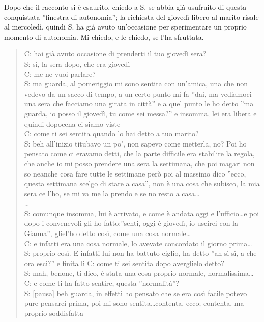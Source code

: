 Dopo che il racconto si è esaurito, chiedo a S. se abbia già usufruito di questa conquistata ''finestra di autonomia''; la richiesta del giovedì libero al marito risale al mercoledì, quindi S. ha già avuto un'occasione per sperimentare un proprio momento di autonomia. Mi chiedo, e le chiedo, se l'ha sfruttata.

\begin{verse}
C: hai già avuto occasione di prenderti il tuo giovedì sera?\\
S: sì, la sera dopo, che era giovedì\\
C: me ne vuoi parlare?\\
S: ma guarda, al pomeriggio mi sono sentita con un'amica, una che non vedevo da un sacco di tempo, a un certo punto mi fa ''dai, ma vediamoci una sera che facciamo una girata in città'' e a quel punto le ho detto ''ma guarda, io posso il giovedì, tu come sei messa?'' e insomma, lei era libera e quindi dopocena ci siamo viste\\
C: come ti sei sentita quando lo hai detto a tuo marito?\\
S: beh all'inizio titubavo un po', non sapevo come metterla, no? Poi ho pensato come ci eravamo detti, che la parte difficile era stabilire la regola, che anche io mi posso prendere una sera la settimana, che poi magari non so neanche cosa fare tutte le settimane però poi al massimo dico ''ecco, questa settimana scelgo di stare a casa'', non è una cosa che subisco, la mia sera ce l'ho, se mi va me la prendo e se no resto a casa\ldots\\
\ldots\\
S: comunque insomma, lui è arrivato, e come è andata oggi e l'ufficio\ldots{}e poi dopo i convenevoli gli ho fatto:''senti, oggi è giovedì, io uscirei con la Gianna'', gliel'ho detto così, come una cosa normale\ldots\\
C: e infatti era  una cosa normale, lo avevate concordato il giorno prima\ldots\\
S: proprio così. E infatti lui non ha battuto ciglio, ha detto ''ah sì sì, a che ora esci?'' e finita lì
C: come ti sei sentita dopo averglielo detto?\\
S: mah, benone, ti dico, è stata una cosa proprio normale, normalissima\ldots\\
C: e come ti ha fatto sentire, questa ''normalità''?\\
S: [pausa] beh guarda, in effetti ho pensato che se era così facile potevo pure pensarci prima, poi mi sono sentita\ldots{}contenta, ecco; contenta, ma proprio soddisfatta\\

\end{verse}
